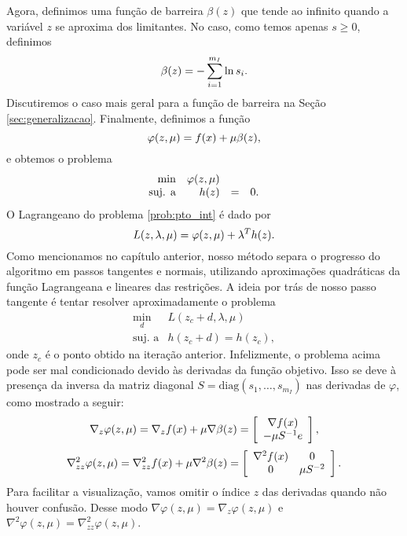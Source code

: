 Agora, definimos uma função de barreira $\beta(z)$ que tende ao infinito quando
a variável $z$ se aproxima dos limitantes. No caso, como temos apenas $s\geq 0$,
definimos
\begin{equation}\visiblelbl{def:beta}
\beta(z) = -\sum_{i=1}^{m_I}\ln s_i.
\end{equation}
Discutiremos o caso mais geral para a função de barreira na Seção
\ref{sec:generalizacao}.
Finalmente, definimos a função
\begin{equation}\visiblelbl{def:phi}
  \varphi(z,\mu) = f(x) + \mu\beta(z),
\end{equation}
e obtemos o problema
\begin{equation}\visiblelbl{prob:pto_int}
 \begin{array}{rrcl}
  \min & \varphi(z,\mu) \\
  \mbox{suj. a} & h(z) & = & 0.
 \end{array}
\end{equation}
O Lagrangeano do problema \eqref{prob:pto_int} é dado por
\begin{equation}
 \visiblelbl{def:lagrangeano}
L(z,\lambda,\mu) = \varphi(z,\mu) + \lambda^Th(z).
\end{equation}
Como mencionamos no capítulo anterior, nosso método separa o progresso do
algoritmo em passos tangentes e normais, utilizando aproximações quadráticas da
função Lagrangeana e lineares das restrições.
A ideia por trás de nosso passo tangente é tentar resolver aproximadamente o
problema
\begin{equation}
  \begin{array}{rl}
    \displaystyle\min_{d} & L(z_c + d,\lambda,\mu) \\
    \mbox{suj. a} & h(z_c+d) = h(z_c),
  \end{array}
\end{equation}
onde $z_c$ é o ponto obtido na iteração anterior.
Infelizmente, o problema acima pode ser mal condicionado devido às derivadas da
função objetivo. Isso se deve à presença da inversa da matriz diagonal 
$S = \mbox{diag}(s_1,\dots,s_{m_I})$ nas derivadas de $\varphi$, como mostrado a
seguir:
$$ \nabla_z\varphi(z,\mu) = \nabla_zf(x) + \mu\nabla\beta(z) = 
\left[\begin{array}{c}\nabla f(x) \\ -\mu S^{-1}e\end{array}\right], $$
$$ \nabla^2_{zz} \varphi(z,\mu) = \nabla_{zz}^2f(x) + \mu\nabla^2\beta(z) = 
\left[\begin{array}{cc}\nabla^2 f(x) & 0 \\ 0 & \mu S^{-2}\end{array}\right]. $$ 
Para facilitar a visualização, vamos omitir o índice $z$
das derivadas quando não houver confusão. Desse modo
$\nabla \varphi(z,\mu) = \nabla_z\varphi(z,\mu)$ 
e $\nabla^2 \varphi(z,\mu) = \nabla^2_{zz}\varphi(z,\mu)$.
